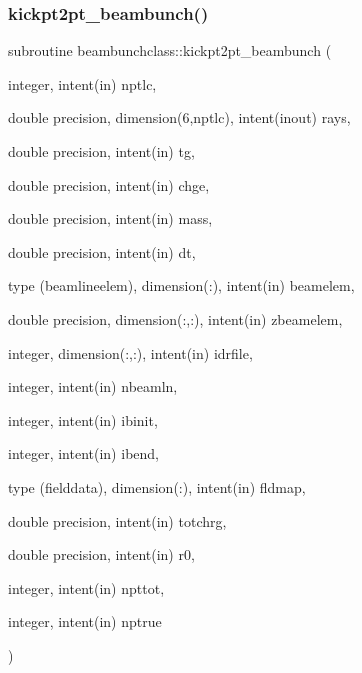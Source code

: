 \subsubsection{\texorpdfstring{kickpt2pt\_beambunch()}{kickpt2pt\_beambunch()}}
{\footnotesize\ttfamily subroutine beambunchclass\+::kickpt2pt\+\_\+beambunch (\begin{DoxyParamCaption}\item[{integer, intent(in)}]{nptlc,  }\item[{double precision, dimension(6,nptlc), intent(inout)}]{rays,  }\item[{double precision, intent(in)}]{tg,  }\item[{double precision, intent(in)}]{chge,  }\item[{double precision, intent(in)}]{mass,  }\item[{double precision, intent(in)}]{dt,  }\item[{type (beamlineelem), dimension(\+:), intent(in)}]{beamelem,  }\item[{double precision, dimension(\+:,\+:), intent(in)}]{zbeamelem,  }\item[{integer, dimension(\+:,\+:), intent(in)}]{idrfile,  }\item[{integer, intent(in)}]{nbeamln,  }\item[{integer, intent(in)}]{ibinit,  }\item[{integer, intent(in)}]{ibend,  }\item[{type (fielddata), dimension(\+:), intent(in)}]{fldmap,  }\item[{double precision, intent(in)}]{totchrg,  }\item[{double precision, intent(in)}]{r0,  }\item[{integer, intent(in)}]{npttot,  }\item[{integer, intent(in)}]{nptrue }\end{DoxyParamCaption})}

